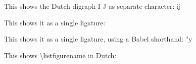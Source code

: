 \documentclass{article}
\begin{document}
This shows the Dutch digraph I J as separate character: ij

This shows it as a single ligature: \ij{}

This shows it as a single ligature, using a Babel shorthand: "y

This shows {\textbackslash}listfigurename in Dutch: \listfigurename
\end{document}
